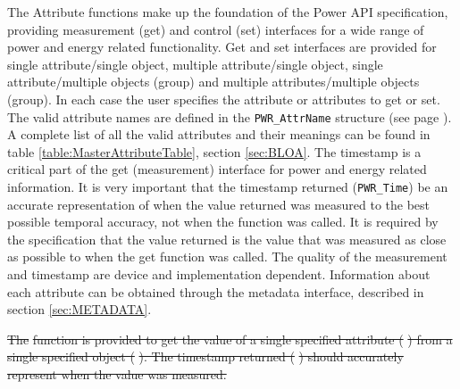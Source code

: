 \documentclass[12pt]{report} %
\providecommand{\DIFdeltex}[1]{{\protect\color{red}\sout{#1}}}                      %
\providecommand{\DIFdelbegin}{} %
\providecommand{\DIFdel}[1]{\texorpdfstring{\DIFdeltex{#1}}{}} %
\newcommand{\DIFscaledelfig}{0.5}
\newlength{\DIFdelgraphicswidth} %
\newlength{\DIFdelgraphicsheight} %
\newcommand{\DIFdelincludegraphics}[2][]{%
\sbox{\DIFdelgraphicsbox}{\DIFOincludegraphics[#1]{#2}}%
\settoboxwidth{\DIFdelgraphicswidth}{\DIFdelgraphicsbox} %
\settoboxtotalheight{\DIFdelgraphicsheight}{\DIFdelgraphicsbox} %
\scalebox{\DIFscaledelfig}{%
\parbox[b]{\DIFdelgraphicswidth}{\usebox{\DIFdelgraphicsbox}\\[-\baselineskip] \rule{\DIFdelgraphicswidth}{0em}}\llap{\resizebox{\DIFdelgraphicswidth}{\DIFdelgraphicsheight}{%
\setlength{\unitlength}{\DIFdelgraphicswidth}%
\begin{picture}(1,1)%
\thicklines\linethickness{2pt} %
{\color[rgb]{1,0,0}\put(0,0){\framebox(1,1){}}}%
{\color[rgb]{1,0,0}\put(0,0){\line( 1,1){1}}}%
{\color[rgb]{1,0,0}\put(0,1){\line(1,-1){1}}}%
\end{picture}%
}\hspace*{3pt}}} %
} %
\DeclareRobustCommand{\DIFdelbegin}{\DIFOdelbegin \let\includegraphics\DIFdelincludegraphics} %
\begin{document}
The Attribute functions make up the foundation of the Power API specification, providing measurement (get) and control (set) interfaces for a wide range of power and energy related functionality.
Get and set interfaces are provided for single attribute/single object, multiple attribute/single object, single attribute/multiple objects (group) and multiple attributes/multiple objects (group).
In each case the user specifies the attribute or attributes to get or set.
The valid attribute names are defined in the \texttt{PWR_AttrName} structure (see page \pageref{type:AttrName}).
A complete list of all the valid attributes and their meanings can be found in table \ref{table:MasterAttributeTable}, section \ref{sec:BLOA}.
The timestamp is a critical part of the get (measurement) interface for power and energy related information.
It is very important that the timestamp returned (\texttt{PWR_Time}) be an accurate representation of when the value returned was measured to the best possible temporal accuracy, not when the function was called.
It is required by the specification that the value returned is the value that was measured as close as possible to when the get function was called.
The quality of the measurement and timestamp are device and implementation dependent.
Information about each attribute can be obtained through the metadata interface, described in section \ref{sec:METADATA}.

%
\DIFdelbegin %

\DIFdel{The }%
\DIFdel{function is provided to get the value of a single specified attribute (}%
\DIFdel{) from a single specified object (}%
\DIFdel{).
The timestamp returned (}%
\DIFdel{) should accurately represent when the value was measured.
}%
\end{document}
